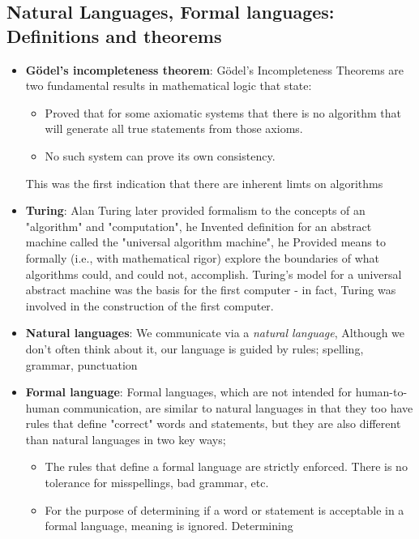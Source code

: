 \documentclass{report}
\begin{document}
    \subsection{Natural Languages, Formal languages: Definitions and theorems}
    \begin{itemize}
        \item \textbf{G\"odel's incompleteness theorem}: 
        G\"odel's Incompleteness Theorems are two fundamental results in mathematical logic that state: 
        \begin{itemize}
            \item  Proved that for some axiomatic
                systems that there is no algorithm
                that will generate all true
                statements from those axioms.
            \item No such system can prove its own consistency.
        \end{itemize}
        This was the first indication that there are inherent limts on algorithms
        \item \textbf{Turing}: Alan Turing later provided formalism to the concepts of an "algorithm" and "computation", he Invented definition for an abstract machine called the "universal algorithm machine", he Provided means to formally (i.e., with mathematical rigor) explore the boundaries of what algorithms could, and could not, accomplish. Turing's model for a universal abstract machine was the basis for the first computer - in fact, Turing was involved in the construction of the first computer.
        \item \textbf{Natural languages}: We communicate via a \textit{natural language}, Although we don't often think about it, our language is
            guided by rules; spelling, grammar, punctuation
        \item \textbf{Formal language}:
            Formal languages, which are not intended for human-to-
            human communication, are similar to natural languages in
            that they too have rules that define "correct" words and
            statements, but they are also different than natural languages
            in two key ways;
            \begin{itemize}
                \item The rules that define a formal language are strictly enforced. There is no tolerance for misspellings, bad grammar, etc.
                \item For the purpose of determining if a word or statement is
                    acceptable in a formal language, meaning is ignored. Determining

\end{itemize}
\end{itemize}
\end{document}
